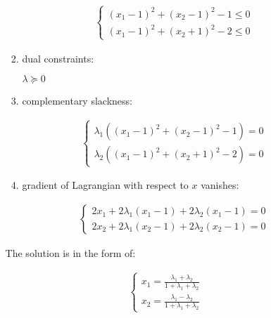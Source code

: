 \documentclass[11pt, letterpaper, titlepage]{article}
\begin{document}
\begin{enumerate}
\begin{enumerate}
\begin{enumerate}
            \begin{gather*}
                \begin{cases}
                (x_1 - 1)^2 + (x_2 - 1)^2 - 1 \leq 0 \\
                (x_1 - 1)^2 + (x_2 + 1)^2 - 2 \leq 0
                \end{cases}
            \end{gather*}
            
            
            \item dual constraints: 
            
            $\lambda \succeq 0$
            
            \item complementary slackness: 
            
            \begin{gather*}
                \begin{cases}
                    \lambda_1((x_1 - 1)^2 + (x_2 - 1)^2 - 1) = 0 \\
                    \lambda_2((x_1 - 1)^2 + (x_2 + 1)^2 - 2) = 0
                \end{cases}
            \end{gather*}
            
            \item gradient of Lagrangian with respect to $x$ vanishes:
            
            \begin{gather*}
                \begin{cases}
                    2 x_1 + 2 \lambda_1 (x_1 - 1) + 2 \lambda_2 (x_1 - 1) = 0 \\
                    2 x_2 + 2 \lambda_1 (x_2 - 1) + 2 \lambda_2 (x_2 - 1) = 0
                \end{cases}
            \end{gather*}
            
        \end{enumerate}
        
        The solution is in the form of:
            
        \begin{gather*}
            \begin{cases}
                x_1 = \frac{\lambda_1 + \lambda_2}{1 + \lambda_1 + \lambda_2} \\
                x_2 = \frac{\lambda_1 - \lambda_2}{1 + \lambda_1 + \lambda_2}
            \end{cases}
        \end{gather*}
        

\end{enumerate}
\end{enumerate}
\end{document}

